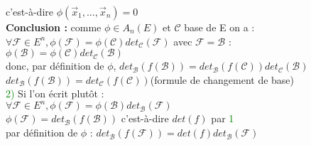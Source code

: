 \documentclass{article}
\begin{document}
c'est-à-dire $\phi(\vec x_1,..., \vec x_n)=0$ \\
{\bf Conclusion :} comme $\phi \in A_n(E)$ et $\mathcal C$ base de E on a : \\
$\forall \mathcal F \in E^n, \phi(\mathcal F)= \phi(\mathcal C)det_{\mathcal C}(\mathcal F)$
avec $\mathcal F=\mathcal B$ : \\
$\phi(\mathcal B)=\phi(\mathcal C) det_{\mathcal C}(\mathcal B)$ \\
donc, par définition de $\phi$, $det_{\mathcal B}(f(\mathcal B))= det_{\mathcal B}(f(\mathcal C))det_{\mathcal C}(\mathcal B)$ \\
$det_{\mathcal B}(f(\mathcal B))=det_{\mathcal C}(f(\mathcal C))$(formule de changement de base) \\
\textcolor{green}{2)} Si l'on écrit plutôt : \\
$\forall \mathcal F \in E^n, \phi(\mathcal F)= \phi(\mathcal B)det_{\mathcal B}(\mathcal F)$ \\
$\phi(\mathcal F)=det_{\mathcal B}(f(\mathcal B))$ c'est-à-dire $det(f)$ par \textcolor{green}{1} \\
par définition de $\phi$ : $det_{\mathcal B}(f(\mathcal F))=det(f)det_{\mathcal B}(\mathcal F)$
\end{document}
